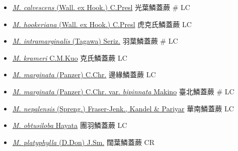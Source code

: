 \begin{itemize}
  \begin{itemize}
        \item[] \href{http://www.theplantlist.org/tpl1.1/search?q=Microlepia+calvescens}{\textit{M. calvescens} (Wall. ex Hook.) C.Presl}   光葉鱗蓋蕨  \# LC
        \item[] \href{http://www.theplantlist.org/tpl1.1/search?q=Microlepia+hookeriana}{\textit{M. hookeriana} (Wall. ex Hook.) C.Presl}   虎克氏鱗蓋蕨   LC
        \item[] \href{http://www.theplantlist.org/tpl1.1/search?q=Microlepia+intramarginalis}{\textit{M. intramarginalis} (Tagawa) Seriz.}   羽葉鱗蓋蕨  \# LC
        \item[] \href{http://www.theplantlist.org/tpl1.1/search?q=Microlepia+krameri}{\textit{M. krameri} C.M.Kuo}   克氏鱗蓋蕨   LC
        \item[] \href{http://www.theplantlist.org/tpl1.1/search?q=Microlepia+marginata}{\textit{M. marginata} (Panzer) C.Chr.}   邊緣鱗蓋蕨   LC
        \item[] \href{http://www.theplantlist.org/tpl1.1/search?q=Microlepia+marginata+var.+bipinnata}{\textit{M. marginata} (Panzer) C.Chr. var. \textit{bipinnata} Makino}  
                                        臺北鱗蓋蕨  \# LC
        \item[] \href{http://www.theplantlist.org/tpl1.1/search?q=Microlepia+nepalensis}{\textit{M. nepalensis} (Spreng.) Fraser-Jenk., Kandel \& Pariyar}   華南鱗蓋蕨   LC
        \item[] \href{http://www.theplantlist.org/tpl1.1/search?q=Microlepia+obtusiloba}{\textit{M. obtusiloba} Hayata}   團羽鱗蓋蕨   LC
        \item[] \href{http://www.theplantlist.org/tpl1.1/search?q=Microlepia+platyphylla}{\textit{M. platyphylla} (D.Don) J.Sm.}   闊葉鱗蓋蕨   CR

\end{itemize}
\end{itemize}
